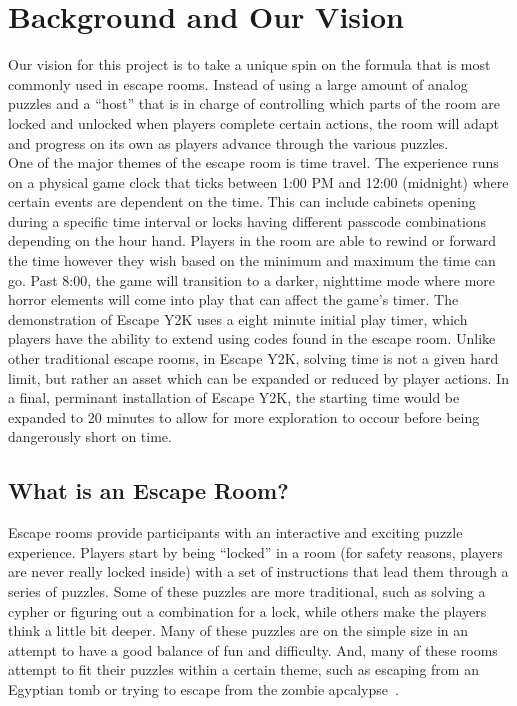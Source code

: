 \documentclass[conference]{IEEEtran}
\begin{document}
\section{Background and Our Vision}
Our vision for this project is to take a unique spin on the formula that is most commonly used in escape rooms.
Instead of using a large amount of analog puzzles and a ``host'' that is in charge of controlling which parts of
the room are locked and unlocked when players complete certain actions, the room will adapt and progress on its
own as players advance through the various puzzles.
\\
\indent One of the major themes of the escape room is time travel. The experience runs
on a physical game clock that ticks between 1:00 PM and 12:00 (midnight) where certain events are
dependent on the time. This can include cabinets opening during a specific time interval or
locks having different passcode combinations depending on the hour hand. Players in the
room are able to rewind or forward the time however they wish based on the minimum and
maximum the time can go. Past 8:00, the game will transition to a darker, nighttime mode where
more horror elements will come into play that can affect the game's timer. The demonstration of Escape
Y2K uses a eight minute initial play timer, which players have the ability to extend using codes found
in the escape room. Unlike other traditional escape rooms, in Escape Y2K, solving time is not a given hard
limit, but rather an asset which can be expanded or reduced by player actions. In a final, perminant installation
of Escape Y2K, the starting time would be expanded to 20 minutes to allow for more exploration to occour before 
being dangerously short on time.

\subsection*{What is an Escape Room?}
Escape rooms provide participants with an interactive and exciting puzzle experience.
Players start by being ``locked'' in a room (for safety reasons, players are never really
locked inside) with a set of instructions that lead them through a series of puzzles. Some of
these puzzles are more traditional, such as solving a cypher or figuring out a combination for a lock,
while others make the players think a little bit deeper. Many of these puzzles are on the simple size in
an attempt to have a good balance of fun and difficulty. And, many of these rooms attempt to fit their
puzzles within a certain theme, such as escaping from an Egyptian tomb or trying to escape from the zombie
apcalypse~\cite{wikipediaEscapeRoom}.
\end{document}
